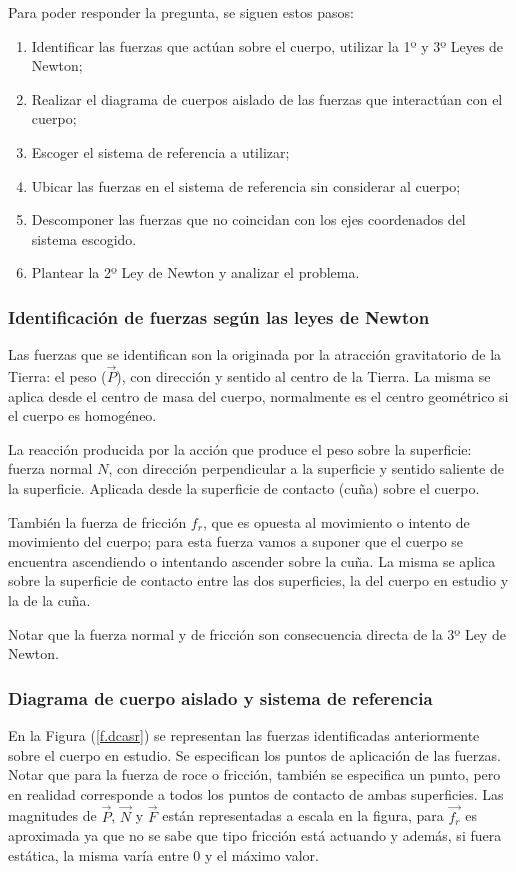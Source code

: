 Para poder responder la pregunta, se siguen estos pasos:
\begin{enumerate}
  \item Identificar las fuerzas que actúan sobre el cuerpo, utilizar la 1º y 3º
    Leyes de Newton;
  \item Realizar el diagrama de cuerpos aislado de las fuerzas que interactúan
    con el cuerpo;
  \item Escoger el sistema de referencia a utilizar;
  \item Ubicar las fuerzas en el sistema de referencia sin considerar al cuerpo;
  \item Descomponer las fuerzas que no coincidan con los ejes coordenados del
    sistema escogido.
  \item Plantear la 2º Ley de Newton y analizar el problema.
\end{enumerate}

\subsubsection{Identificación de fuerzas según las leyes de Newton}

Las fuerzas que se identifican son la originada por la atracción gravitatorio de
la Tierra: el peso ($\vec{P}$), con dirección y sentido al centro de la Tierra.
La misma se aplica desde el centro de masa del cuerpo, normalmente es el centro
geométrico si el cuerpo es homogéneo.

La reacción producida por la acción que produce el peso sobre la superficie:
fuerza normal $N$, con dirección perpendicular a la superficie y sentido
saliente de la superficie. Aplicada desde la superficie de contacto (cuña) sobre
el cuerpo.

También la fuerza de fricción $f_r$, que es opuesta al movimiento o intento de
movimiento del cuerpo; para esta fuerza vamos a suponer que el cuerpo se
encuentra ascendiendo o intentando ascender sobre la cuña. La misma se aplica
sobre la superficie de contacto entre las dos superficies, la del cuerpo en
estudio y la de la cuña.

Notar que la fuerza normal y de fricción son consecuencia directa de la 3º Ley
de Newton.

\subsubsection{Diagrama de cuerpo aislado y sistema de referencia}

En la Figura (\ref{f.dcasr}) se representan las fuerzas identificadas
anteriormente sobre el cuerpo en estudio. Se especifican los puntos de
aplicación de las fuerzas. Notar que para la fuerza de roce o fricción, también
se especifica un punto, pero en realidad corresponde a todos los puntos de
contacto de ambas superficies. Las magnitudes de $\vec{P}$, $\vec{N}$ y
$\vec{F}$ están representadas a escala en la figura, para $\vec{f_r}$ es
aproximada ya que no se sabe que tipo fricción está actuando y además, si fuera
estática, la misma varía entre 0 y el máximo valor.

